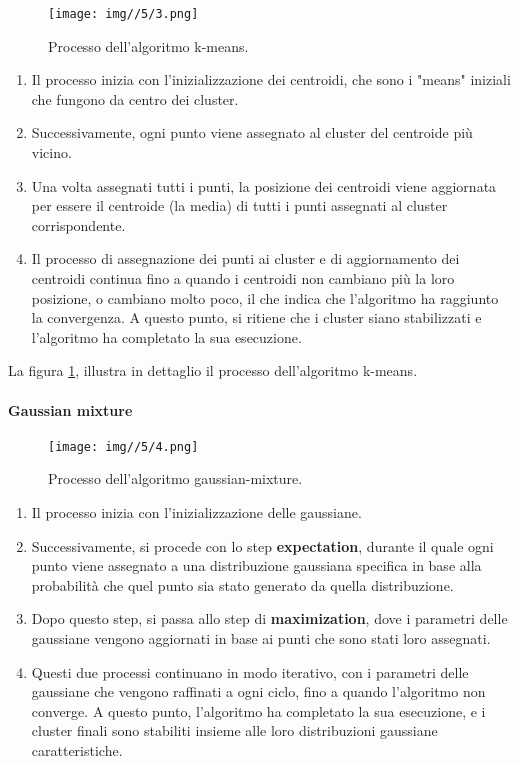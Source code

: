 \begin{figure}[t]
    \centering
    \texttt{[image: img//5/3.png]}
    \caption{Processo dell'algoritmo k-means.}
    \label{fig:5-3}
\end{figure}

\begin{enumerate}
    \item Il processo inizia con l'inizializzazione dei centroidi, che sono i "means" iniziali che fungono da centro dei cluster.
    \item Successivamente, ogni punto viene assegnato al cluster del centroide più vicino.
    \item Una volta assegnati tutti i punti, la posizione dei centroidi viene aggiornata per essere il centroide (la media) di tutti i punti assegnati al cluster corrispondente.
    \item Il processo di assegnazione dei punti ai cluster e di aggiornamento dei centroidi continua fino a quando i centroidi non cambiano più la loro posizione, o cambiano molto poco, il che indica che l'algoritmo ha raggiunto la convergenza. A questo punto, si ritiene che i cluster siano stabilizzati e l'algoritmo ha completato la sua esecuzione.
\end{enumerate}

\bigskip

La figura \ref{fig:5-3}, illustra in dettaglio il processo dell'algoritmo k-means.

\paragraph{Gaussian mixture}

\begin{figure}[t]
    \centering
    \texttt{[image: img//5/4.png]}
    \caption{Processo dell'algoritmo gaussian-mixture.}
    \label{fig:5-4}
\end{figure}

\begin{enumerate}
    \item Il processo inizia con l'inizializzazione delle gaussiane.
    \item Successivamente, si procede con lo step \textbf{expectation}, durante il quale ogni punto viene assegnato a una distribuzione gaussiana specifica in base alla probabilità che quel punto sia stato generato da quella distribuzione.
    \item Dopo questo step, si passa allo step di \textbf{maximization}, dove i parametri delle gaussiane vengono aggiornati in base ai punti che sono stati loro assegnati.
    \item Questi due processi continuano in modo iterativo, con i parametri delle gaussiane che vengono raffinati a ogni ciclo, fino a quando l'algoritmo non converge. A questo punto, l'algoritmo ha completato la sua esecuzione, e i cluster finali sono stabiliti insieme alle loro distribuzioni gaussiane caratteristiche.
\end{enumerate}

